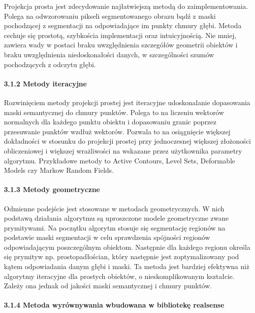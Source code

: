 \documentclass[
]{article}
\begin{document}
Projekcja prosta jest zdecydowanie najłatwiejszą metodą do zaimplementowania. Polega na odwzorowaniu pikseli segmentowanego obrazu bądź z maski pochodzącej z segmentacji na odpowiadające im punkty chmury głębi.
Metoda cechuje się prostotą, szybkościa implementacji oraz intuicyjnością. Nie mniej, zawiera wady w postaci braku uwzględnienia szczegółów geometrii obiektów i braku uwzględnienia niedoskonałości danych, w szczególności szumów pochodzących z odczytu głębi.

\paragraph{3.1.2 Metody iteracyjne}\label{metody-iteracyjne}

Rozwinięciem metody projekcji prostej jest iteracyjne udoskonalanie dopasowania maski semantycznej do chmury punktów. Polega to na liczeniu wektorów normalnych dla każdego punktu obiektu i dopasowaniu granic poprzez przesuwanie punktów wzdłuż wektorów. Pozwala to na osiągnięcie większej dokładności w stosunku do projekcji prostej przy jednoczesnej większej złożoności obliczeniowej i większej wrażliwości na wskazane przez użytkownika parametry algorytmu. Przykładowe metody to Active Contours, Level Sets, Deformable Models czy Markow Random Fields.

\paragraph{3.1.3 Metody geometryczne}\label{metody-geometryczne}

Odmienne podejście jest stosowane w metodach geometrycznych. W nich podstawą działania algorytmu są uproszczone modele geometryczne zwane prymitywami. Na początku algorytm stosuje się segmentację regionów na podstawie maski segmentacji w celu sprawdzenia spójności regionów odpowiadającym poszczególnym obiektom. Następnie dla każdego regionu określa się prymityw np. prostopadłościan, który następnie jest zoptymalizowany pod kątem odpowiadania danym głębi i maski.
Ta metoda jest bardziej efektywna niż algorytmy iteracyjne dla prostych obiektów, o nieskomplikowanym kształcie. Zależy ona jednak od jakości maski semantycznej i chmury punktów.

\paragraph{3.1.4 Metoda wyrównywania wbudowana w bibliotekę realsense}\label{metoda-wyruxf3wnywania-wbudowana-w-bibliotekux119-realsense}
\end{document}
